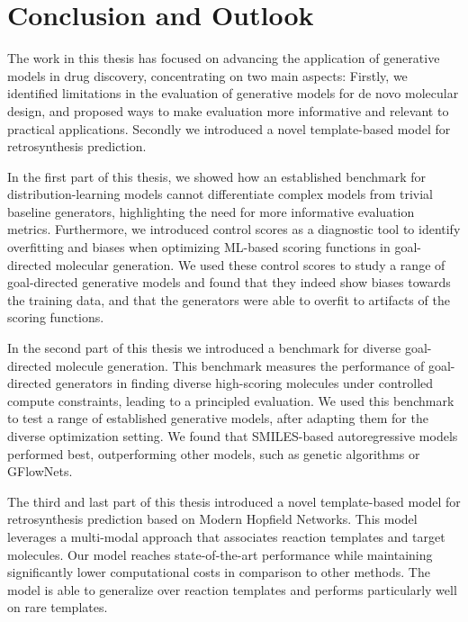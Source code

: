 \chapter{Conclusion and Outlook\label{chap:conclusion}}

The work in this thesis has focused on advancing the application of generative models in drug
discovery, concentrating on two main aspects: Firstly, we identified limitations in the evaluation
of generative models for de novo molecular design, and proposed ways to make evaluation more
informative and relevant to practical applications. Secondly we introduced a novel template-based
model for retrosynthesis prediction.

In the first part of this thesis, we showed how an established benchmark for distribution-learning
models cannot differentiate complex models from trivial baseline generators, highlighting the need
for more informative evaluation metrics. Furthermore, we introduced control scores as a diagnostic
tool to identify overfitting and biases when optimizing \ac{ML}-based scoring functions in
goal-directed molecular generation. We used these control scores to study a range of goal-directed
generative models and found that they indeed show biases towards the training data, and that the
generators were able to overfit to artifacts of the scoring functions.

In the second part of this thesis we introduced a benchmark for diverse goal-directed molecule
generation. This benchmark measures the performance of goal-directed generators in finding diverse
high-scoring molecules under controlled compute constraints, leading to a principled evaluation. We
used this benchmark to test a range of established generative models, after adapting them for the
diverse optimization setting. We found that SMILES-based autoregressive models performed best,
outperforming other models, such as genetic algorithms or GFlowNets.

The third and last part of this thesis introduced a novel template-based model for retrosynthesis
prediction based on Modern Hopfield Networks. This model leverages a multi-modal approach that
associates reaction templates and target molecules. Our model reaches state-of-the-art performance
while maintaining significantly lower computational costs in comparison to other methods. The model
is able to generalize over reaction templates and performs particularly well on rare templates.

